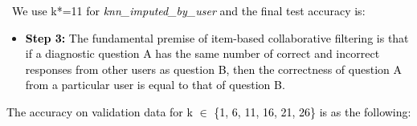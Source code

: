 \documentclass[letterpaper]{article}
\begin{document}



\bigskip

\textcolor{black}{\ We use k*=11 for }\textit{\textcolor{black}{knn\_imputed\_by\_user}}\textcolor{black}{ and the final
test accuracy is:}




\begin{itemize}[series=listWWNumii,label=[F0B7?]]
\item \textbf{\textcolor{black}{Step 3:}}\textcolor{black}{ The fundamental premise of item-based collaborative
filtering is that if a diagnostic question A has the same number of correct and incorrect responses from other users as
question B, then the correctness of question A from a particular user is equal to that of question B.}
\end{itemize}
\textcolor{black}{The accuracy on validation data for k ${\in}$ \{1, 6, 11, 16, 21, 26\} is as the following:}
\end{document}
